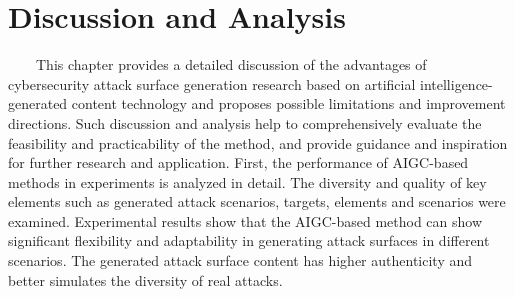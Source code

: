 \documentclass[runningheads]{llncs}
\begin{document}
\section{Discussion and Analysis}
\ \ \ \ This chapter provides a detailed discussion of the advantages of cybersecurity attack surface generation research based on artificial intelligence-generated content technology and proposes possible limitations and improvement directions. Such discussion and analysis help to comprehensively evaluate the feasibility and practicability of the method, and provide guidance and inspiration for further research and application. First, the performance of AIGC-based methods in experiments is analyzed in detail. The diversity and quality of key elements such as generated attack scenarios, targets, elements and scenarios were examined. Experimental results show that the AIGC-based method can show significant flexibility and adaptability in generating attack surfaces in different scenarios. The generated attack surface content has higher authenticity and better simulates the diversity of real attacks.\par
%
\end{document}
